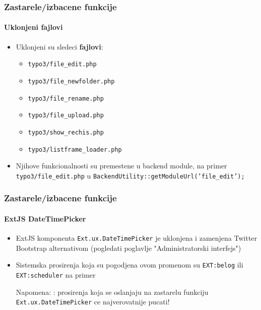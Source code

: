 \begin{frame}[fragile]
	\frametitle{Zastarele/izbacene funkcije}
	\framesubtitle{Uklonjeni fajlovi}

	\begin{itemize}
		\item Uklonjeni su sledeci \textbf{fajlovi}:

			\begin{itemize}
				\item \texttt{typo3/file\_edit.php}
				\item \texttt{typo3/file\_newfolder.php}
				\item \texttt{typo3/file\_rename.php}
				\item \texttt{typo3/file\_upload.php}
				\item \texttt{typo3/show\_rechis.php}
				\item \texttt{typo3/listframe\_loader.php}
			\end{itemize}

		\item Njihove funkcionalnosti su premestene u backend module, 
			na primer \texttt{typo3/file\_edit.php} u \texttt{BackendUtility::getModuleUrl('file\_edit');}

	\end{itemize}

\end{frame}


\begin{frame}[fragile]
	\frametitle{Zastarele/izbacene funkcije}
	\framesubtitle{ExtJS DateTimePicker}

	\begin{itemize}

		\item ExtJS komponenta \texttt{Ext.ux.DateTimePicker} je uklonjena i zamenjena Twitter Bootstrap alternativom
			(pogledati poglavlje "Administratorski interfejs")

		\item Sistemska prosirenja koja su pogodjena ovom promenom su \texttt{EXT:belog} ili
			\texttt{EXT:scheduler} na primer

			\vspace{0.2cm}

			\begingroup
				\color{red}
					Napomena: : prosirenja koja se oslanjaju na zastarelu funkciju
					\texttt{Ext.ux.DateTimePicker} ce najverovatnije pucati!
			\endgroup

	\end{itemize}

\end{frame}

